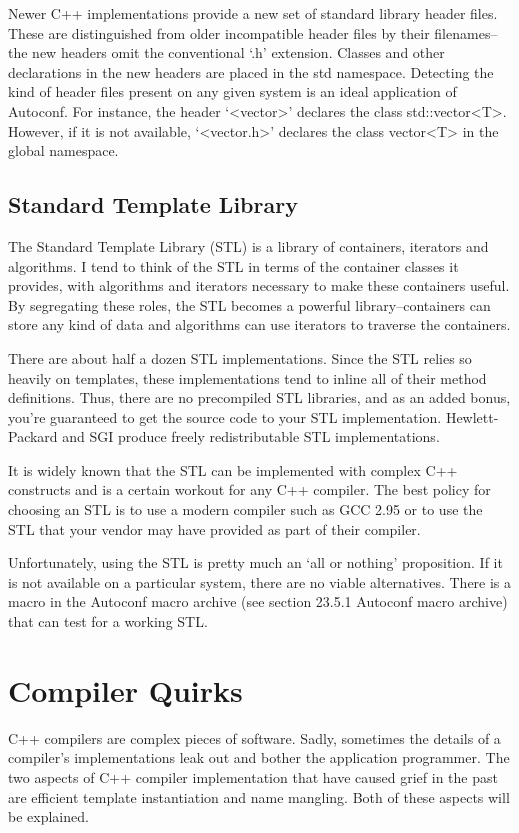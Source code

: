 Newer C++ implementations provide a new set of standard library header files. These are distinguished from older incompatible header files by their filenames--the new headers omit the conventional `.h' extension. Classes and other declarations in the new headers are placed in the std namespace. Detecting the kind of header files present on any given system is an ideal application of Autoconf. For instance, the header `<vector>' declares the class std::vector<T>. However, if it is not available, `<vector.h>' declares the class vector<T> in the global namespace. 

\subsection{Standard Template Library}

The Standard Template Library (STL) is a library of containers, iterators and algorithms. I tend to think of the STL in terms of the container classes it provides, with algorithms and iterators necessary to make these containers useful. By segregating these roles, the STL becomes a powerful library--containers can store any kind of data and algorithms can use iterators to traverse the containers.

There are about half a dozen STL implementations. Since the STL relies so heavily on templates, these implementations tend to inline all of their method definitions. Thus, there are no precompiled STL libraries, and as an added bonus, you're guaranteed to get the source code to your STL implementation. Hewlett-Packard and SGI produce freely redistributable STL implementations.

It is widely known that the STL can be implemented with complex C++ constructs and is a certain workout for any C++ compiler. The best policy for choosing an STL is to use a modern compiler such as GCC 2.95 or to use the STL that your vendor may have provided as part of their compiler.

Unfortunately, using the STL is pretty much an `all or nothing' proposition. If it is not available on a particular system, there are no viable alternatives. There is a macro in the Autoconf macro archive (see section 23.5.1 Autoconf macro archive) that can test for a working STL. 

\section{Compiler Quirks}

C++ compilers are complex pieces of software. Sadly, sometimes the details of a compiler's implementations leak out and bother the application programmer. The two aspects of C++ compiler implementation that have caused grief in the past are efficient template instantiation and name mangling. Both of these aspects will be explained. 

